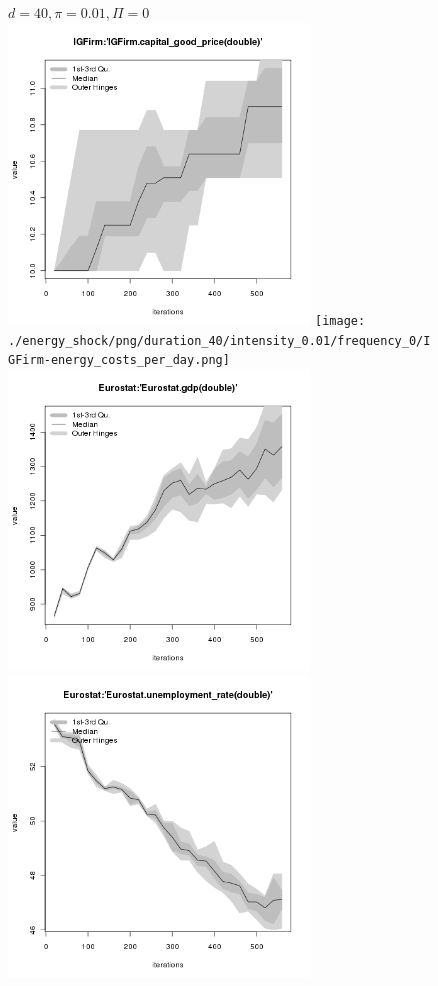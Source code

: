\begin{figure}[ht!]
\centering\leavevmode
\begin{minipage}{17cm}
\centering\leavevmode
{$d=40, \pi=0.01, \Pi=0$}\\
\includegraphics[width=8cm]{./energy_shock/png/duration_40/intensity_0.01/frequency_0/IGFirm-capital_good_price.png}
\texttt{[image: ./energy\_shock/png/duration\_40/intensity\_0.01/frequency\_0/IGFirm-energy\_costs\_per\_day.png]}
\includegraphics[width=8cm]{./energy_shock/png/duration_40/intensity_0.01/frequency_0/Eurostat-gdp.png}
\includegraphics[width=8cm]{./energy_shock/png/duration_40/intensity_0.01/frequency_0/Eurostat-unemployment_rate.png}
\end{minipage}
\end{figure}

